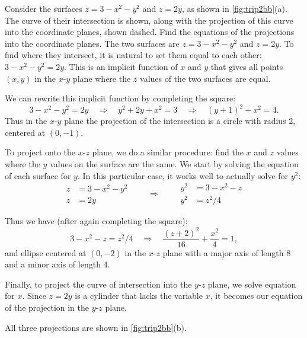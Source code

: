 \begin{example}\label{ex_trip2b}
Consider the surfaces $z=3-x^2-y^2$ and $z=2y$, as shown in \autoref{fig:trip2bb}(a). The curve of their intersection is shown, along with the projection of this curve into the coordinate planes, shown dashed. Find the equations of the projections into the coordinate planes.
\solution
The two surfaces are $z=3-x^2-y^2$ and $z=2y$. To find where they intersect, it is natural to set them equal to each other: $3-x^2-y^2=2y$. This is an implicit function of $x$ and $y$ that gives all points $(x,y)$ in the $x$-$y$ plane where the $z$ values of the two surfaces are equal. 

We can rewrite this implicit function by completing the square:
\[3-x^2-y^2=2y \quad \Rightarrow \quad y^2+2y+x^2=3\quad \Rightarrow \quad (y+1)^2+x^2=4.\]
Thus in the $x$-$y$ plane the projection of the intersection is a circle with radius 2, centered at $(0,-1)$.

To project onto the $x$-$z$ plane, we do a similar procedure: find the $x$ and $z$ values where the $y$ values on the surface are the same. We start by solving the equation of each surface for $y$. In this particular case, it works well to actually solve for $y^2$:
\[
\begin{aligned}
z&=3-x^2-y^2\\
z&=2y
\end{aligned}
\qquad\Rightarrow\qquad
\begin{aligned}
y^2&=3-x^2-z\\
y^2&=z^2/4
\end{aligned}
\]

Thus we have (after again completing the square):
\[3-x^2-z = z^2/4 \quad \Rightarrow\quad \frac{(z+2)^2}{16}+\frac{x^2}4=1,\]
and ellipse centered at $(0,-2)$ in the $x$-$z$ plane with a major axis of length 8 and a minor axis of length 4. 

Finally, to project the curve of intersection into the $y$-$z$ plane, we solve equation for $x$. Since $z=2y$ is a cylinder that lacks the variable $x$, it becomes our equation of the projection in the $y$-$z$ plane.

All three projections are shown in \autoref{fig:trip2bb}(b).
\end{example}


